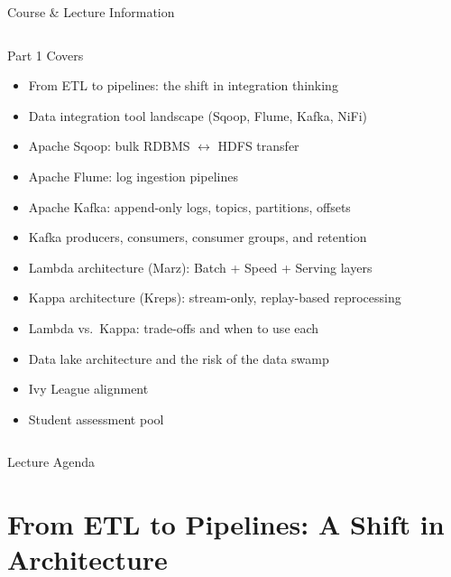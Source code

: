 \documentclass[aspectratio=169,10pt]{beamer}
\begin{document}
\begin{frame}{Course \& Lecture Information}
\begin{columns}[T]
      \begin{exampleblock}{Part 1 Covers}
        \begin{itemize}
          \item From ETL to pipelines: the shift in integration thinking
          \item Data integration tool landscape (Sqoop, Flume, Kafka, NiFi)
          \item Apache Sqoop: bulk RDBMS $\leftrightarrow$ HDFS transfer
          \item Apache Flume: log ingestion pipelines
          \item Apache Kafka: append-only logs, topics, partitions, offsets
          \item Kafka producers, consumers, consumer groups, and retention
          \item Lambda architecture (Marz): Batch + Speed + Serving layers
          \item Kappa architecture (Kreps): stream-only, replay-based reprocessing
          \item Lambda vs.\ Kappa: trade-offs and when to use each
          \item Data lake architecture and the risk of the data swamp
          \item Ivy League alignment
          \item Student assessment pool
        \end{itemize}
      \end{exampleblock}
  \end{columns}
\end{frame}

\begin{frame}{Lecture Agenda}
  \tableofcontents
\end{frame}

\section{From ETL to Pipelines: A Shift in Architecture}
\end{document}
